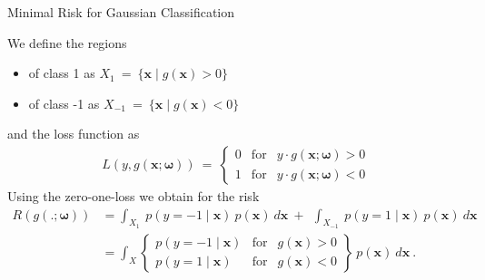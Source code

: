 \documentclass[xcolor=pdftex,dvipsnames,table]{beamer}
\begin{document}

\begin{frame}{Minimal Risk for Gaussian Classification}
	\par
	\scriptsize
	\textcolor{NavyBlue}{We define the regions}
	\begin{itemize}
		\item of class 1 as $X_1 \ = \ \{ \mathbf{x} \mid g(\mathbf{x}) > 0 \}$
		\item of class -1 as $X_{-1} \ = \ \{ \mathbf{x} \mid g(\mathbf{x}) < 0 \} $
	\end{itemize}
	\textcolor{NavyBlue}{and the loss function as}
	\begin{eqnarray*}
		L(y,g(\mathbf{x};\mathbf{\omega})) \ = \ \left\{
		\begin{array}{lll}
			0 & \mbox{for} & y \cdot g(\mathbf{x};\mathbf{\omega}) > 0 \\
			1 & \mbox{for} & y \cdot g(\mathbf{x};\mathbf{\omega}) < 0
		\end{array} \right.
	\end{eqnarray*}
	\textcolor{NavyBlue}{Using the zero-one-loss we obtain for the risk} 
	\begin{equation*}
		\begin{split}
			R(g(.;\mathbf{\omega})) %
			& =
			\int_{X_1} \
				p\left(y=-1 \mid \mathbf{x} \right) \ p(\mathbf{x}) \ d\mathbf{x} \ + \  \ \int_{X_{-1}} 
				\ p\left(y=1 \mid \mathbf{x} \right)  \ p(\mathbf{x}) \ d\mathbf{x} \\ & =
			\int_{X} \left\{ \begin{array}{lll}
					p\left(y=-1 \mid \mathbf{x} \right) & \mbox{for} & g(\mathbf{x}) > 0 \\
					p\left(y=1 \mid \mathbf{x} \right) & \mbox{for} & g(\mathbf{x}) < 0
				\end{array} \right\}
				\ p(\mathbf{x}) \ d\mathbf{x} \ .
		\end{split}
	\end{equation*}
\end{frame}
\end{document}
